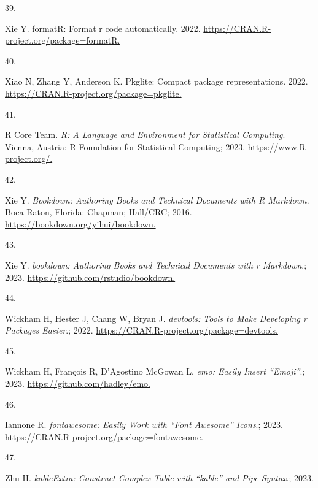 \documentclass[
]{book}
\newlength{\cslhangindent}
\newlength{\csllabelwidth}
\newlength{\cslentryspacingunit} %
\newenvironment{CSLReferences}[2] %
 {%
  \setlength{\parindent}{0pt}
  \ifodd #1
  \let\oldpar\par
  \def\par{\hangindent=\cslhangindent\oldpar}
  \fi
  \setlength{\parskip}{#2\cslentryspacingunit}
 }%
 {}
\newcommand{\CSLLeftMargin}[1]{\parbox[t]{\csllabelwidth}{#1}}
\newcommand{\CSLRightInline}[1]{\parbox[t]{\linewidth - \csllabelwidth}{#1}\break}
\begin{document}
\begin{CSLReferences}{0}{0}
\leavevmode{}%
\CSLLeftMargin{39. }%
\CSLRightInline{Xie Y. formatR: Format r code automatically. 2022. \href{https://CRAN.R-project.org/package=formatR}{https://CRAN.R-project.org/package=formatR.}}

\leavevmode{}%
\CSLLeftMargin{40. }%
\CSLRightInline{Xiao N, Zhang Y, Anderson K. Pkglite: Compact package representations. 2022. \href{https://CRAN.R-project.org/package=pkglite}{https://CRAN.R-project.org/package=pkglite.}}

\leavevmode{}%
\CSLLeftMargin{41. }%
\CSLRightInline{R Core Team. \emph{{R}: A Language and Environment for Statistical Computing}. Vienna, Austria: R Foundation for Statistical Computing; 2023. \href{https://www.R-project.org/}{https://www.R-project.org/.}}

\leavevmode{}%
\CSLLeftMargin{42. }%
\CSLRightInline{Xie Y. \emph{Bookdown: Authoring Books and Technical Documents with {R} Markdown}. Boca Raton, Florida: Chapman; Hall/CRC; 2016. \href{https://bookdown.org/yihui/bookdown}{https://bookdown.org/yihui/bookdown.}}

\leavevmode{}%
\CSLLeftMargin{43. }%
\CSLRightInline{Xie Y. \emph{{bookdown}: Authoring Books and Technical Documents with r Markdown}.; 2023. \href{https://github.com/rstudio/bookdown}{https://github.com/rstudio/bookdown.}}

\leavevmode{}%
\CSLLeftMargin{44. }%
\CSLRightInline{Wickham H, Hester J, Chang W, Bryan J. \emph{{devtools}: Tools to Make Developing r Packages Easier}.; 2022. \href{https://CRAN.R-project.org/package=devtools}{https://CRAN.R-project.org/package=devtools.}}

\leavevmode{}%
\CSLLeftMargin{45. }%
\CSLRightInline{Wickham H, François R, D'Agostino McGowan L. \emph{{emo}: Easily Insert {``{Emoji}''}}.; 2023. \href{https://github.com/hadley/emo}{https://github.com/hadley/emo.}}

\leavevmode{}%
\CSLLeftMargin{46. }%
\CSLRightInline{Iannone R. \emph{{fontawesome}: Easily Work with {``{Font Awesome}''} Icons}.; 2023. \href{https://CRAN.R-project.org/package=fontawesome}{https://CRAN.R-project.org/package=fontawesome.}}

\leavevmode{}%
\CSLLeftMargin{47. }%
\CSLRightInline{Zhu H. \emph{{kableExtra}: Construct Complex Table with {``{kable}''} and Pipe Syntax}.; 2023.}


\end{CSLReferences}
\end{document}

